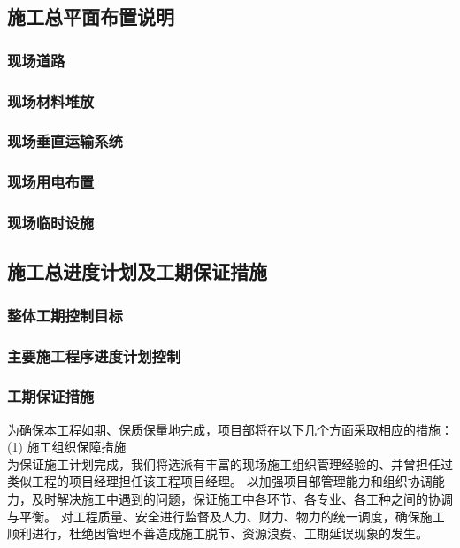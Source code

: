 \subsection{施工总平面布置说明}
\subsubsection{现场道路}
\subsubsection{现场材料堆放}
\subsubsection{现场垂直运输系统}
\subsubsection{现场用电布置}
\subsubsection{现场临时设施}

\subsection{施工总进度计划及工期保证措施}
\subsubsection{整体工期控制目标}
\subsubsection{主要施工程序进度计划控制}
\subsubsection{工期保证措施}

为确保本工程如期、保质保量地完成，项目部将在以下几个方面采取相应的措施：\\

(1) 施工组织保障措施\\

为保证施工计划完成，我们将选派有丰富的现场施工组织管理经验的、并曾担任过类似工程的项目经理担任该工程项目经理。
以加强项目部管理能力和组织协调能力，及时解决施工中遇到的问题，保证施工中各环节、各专业、各工种之间的协调与平衡。
对工程质量、安全进行监督及人力、财力、物力的统一调度，确保施工顺利进行，杜绝因管理不善造成施工脱节、资源浪费、工期延误现象的发生。\\

